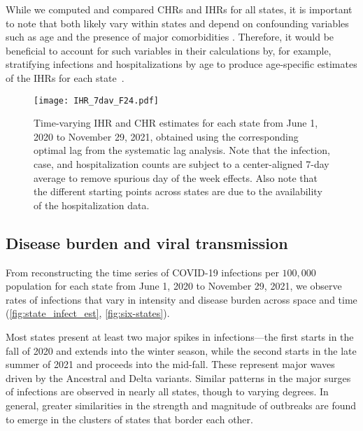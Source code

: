 While we computed and compared CHRs and IHRs for all states, it is important to
note that both likely vary within states and depend on confounding variables
such as age and the presence of major comorbidities
\citep{russell2023comorbidities}. Therefore, it would be beneficial to account
for such variables in their calculations by, for example, stratifying infections
and hospitalizations by age to produce age-specific estimates of the IHRs for
each state~\citep{fox2023disproportionate}.



\begin{figure}[!tb]
\centering
\texttt{[image: IHR\_7dav\_F24.pdf]}
\caption{Time-varying IHR and CHR estimates for each state from June 1, 2020
to November 29, 2021, obtained using the corresponding optimal lag from the
systematic lag analysis. Note that the infection, case, and hospitalization
counts are subject to a center-aligned 7-day average to remove spurious day
of the week effects. Also note that the different starting points across
states are due to the availability of the hospitalization data.}
\label{fig:IHR_7dav}
\end{figure}


\subsection{Disease burden and viral transmission}


From reconstructing the time series of COVID-19 infections per $100,000$
population for each \US state from June 1, 2020 to November 29, 2021, we
observe rates of infections that vary in intensity and disease burden across
space and time (\autoref{fig:state_infect_est}, \autoref{fig:six-states}).  

Most states present at least two major spikes in infections---the first starts
in the fall of 2020 and extends into the winter season, while the second starts
in the late summer of 2021 and proceeds into the mid-fall. These represent major
waves driven by the Ancestral and Delta variants. Similar patterns in the major
surges of infections are observed in nearly all states, though to varying
degrees. In general, greater similarities in the strength and magnitude of
outbreaks are found to emerge in the clusters of states that border each other.


